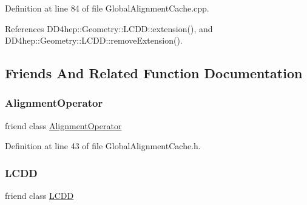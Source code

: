 Definition at line 84 of file Global\+Alignment\+Cache.\+cpp.



References D\+D4hep\+::\+Geometry\+::\+L\+C\+D\+D\+::extension(), and D\+D4hep\+::\+Geometry\+::\+L\+C\+D\+D\+::remove\+Extension().



\subsection{Friends And Related Function Documentation}
\hypertarget{class_d_d4hep_1_1_alignments_1_1_global_alignment_cache_a0123c592b59946302df6795784a503e4}{}\label{class_d_d4hep_1_1_alignments_1_1_global_alignment_cache_a0123c592b59946302df6795784a503e4} 
\subsubsection{\texorpdfstring{Alignment\+Operator}{AlignmentOperator}}
{\footnotesize\ttfamily friend class \hyperlink{class_d_d4hep_1_1_alignments_1_1_alignment_operator}{Alignment\+Operator}\hspace{0.3cm}{\ttfamily [friend]}}



Definition at line 43 of file Global\+Alignment\+Cache.\+h.

\hypertarget{class_d_d4hep_1_1_alignments_1_1_global_alignment_cache_a7e41b5a9f3843a7e39b0a2f9d618ae4a}{}\label{class_d_d4hep_1_1_alignments_1_1_global_alignment_cache_a7e41b5a9f3843a7e39b0a2f9d618ae4a} 
\subsubsection{\texorpdfstring{L\+C\+DD}{LCDD}}
{\footnotesize\ttfamily friend class \hyperlink{class_d_d4hep_1_1_geometry_1_1_l_c_d_d}{L\+C\+DD}\hspace{0.3cm}{\ttfamily [friend]}}



